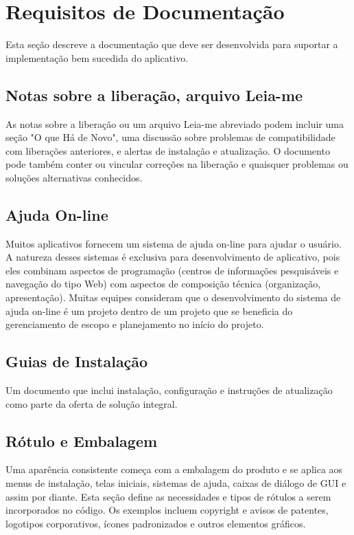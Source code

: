 \documentclass{report}
\begin{document}
\chapter{Requisitos de Documentação}

Esta seção descreve a documentação que deve ser desenvolvida para suportar a
implementação bem sucedida do aplicativo.

\section{Notas sobre a liberação, arquivo Leia-me}

As notas sobre a liberação ou um arquivo Leia-me abreviado podem incluir uma
seção "O que Há de Novo", uma discussão sobre problemas de compatibilidade com
liberações anteriores, e alertas de instalação e atualização. O documento pode
também conter ou vincular correções na liberação e quaisquer problemas ou
soluções alternativas conhecidos. \section{Ajuda On-line}

Muitos aplicativos fornecem um sistema de ajuda on-line para ajudar o usuário.
A natureza desses sistemas é exclusiva para desenvolvimento de aplicativo, pois
eles combinam aspectos de programação (centros de informações pesquisáveis e
navegação do tipo Web) com aspectos de composição técnica (organização,
apresentação). Muitas equipes consideram que o desenvolvimento do sistema de
ajuda on-line é um projeto dentro de um projeto que se beneficia do
gerenciamento de escopo e planejamento no início do projeto.

\section{Guias de Instalação}

Um documento que inclui instalação, configuração e instruções de atualização
como parte da oferta de solução integral.

\section{Rótulo e Embalagem}

Uma aparência consistente começa com a embalagem do produto e se aplica aos
menus de instalação, telas iniciais, sistemas de ajuda, caixas de diálogo de
GUI e assim por diante. Esta seção define as necessidades e tipos de rótulos a
serem incorporados no código. Os exemplos incluem copyright e avisos de
patentes, logotipos corporativos, ícones padronizados e outros elementos
gráficos.
\end{document}
